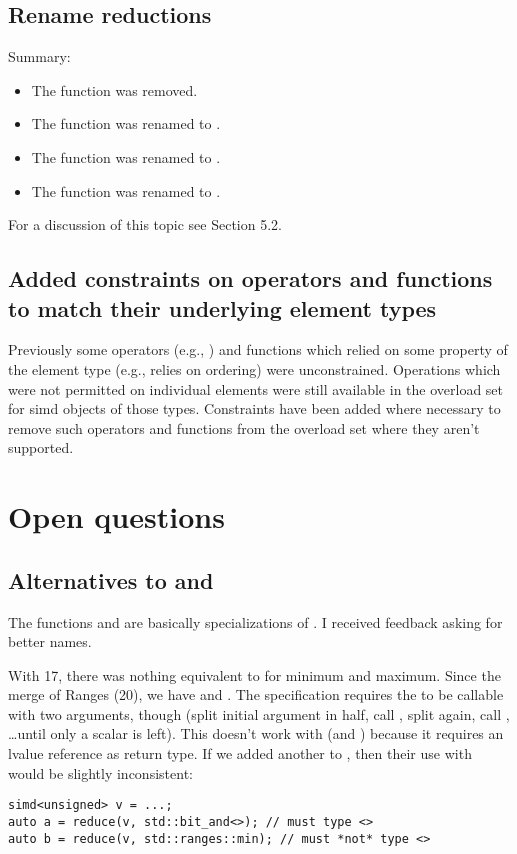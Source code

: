 \subsection{Rename  reductions}
Summary:
\begin{itemize}
  \item The function \stdx{} was removed.
  \item The function \stdx{} was renamed to \std{}.
  \item The function \stdx{} was renamed to \std{}.
  \item The function \stdx{} was renamed to \std{}.
\end{itemize}

For a discussion of this topic see  Section 5.2.

\subsection{Added constraints on operators and functions to match their underlying element types}

Previously some operators (e.g., ) and functions which relied on
some property of the element type (e.g.,  relies on ordering)
were unconstrained. Operations which were not permitted on individual elements
were still available in the overload set for simd objects of those types.
Constraints have been added where necessary to remove such operators and
functions from the overload set where they aren't supported.

\section{Open questions}

\subsection{Alternatives to  and }
The functions  and  are basically
specializations of .
I received feedback asking for better names.

With \CC{}17, there was nothing equivalent to  for minimum
and maximum.
Since the merge of Ranges (\CC{}20), we have \stdranges{} and
\stdranges{}.
The  specification requires the  to be
callable with two  arguments, though (split initial argument in
half, call , split again, call , \ldots until
only a scalar is left).
This doesn't work with \stdranges{} (and ) because it
requires an lvalue reference as return type.
If we added another  to \stdranges{}, then their
use with  would be slightly inconsistent:
\medskip\begin{lstlisting}
simd<unsigned> v = ...;
auto a = reduce(v, std::bit_and<>); // must type <>
auto b = reduce(v, std::ranges::min); // must *not* type <>
\end{lstlisting}

